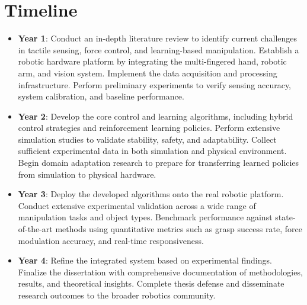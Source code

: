 \documentclass[11pt,a4paper]{article}
\begin{document}


\section{Timeline}

\begin{itemize}
    \item \textbf{Year 1}: Conduct an in-depth literature review to identify current challenges in tactile sensing, force control, and learning-based manipulation. Establish a robotic hardware platform by integrating the multi-fingered hand, robotic arm, and vision system. Implement the data acquisition and processing infrastructure. Perform preliminary experiments to verify sensing accuracy, system calibration, and baseline performance.
    
    \item \textbf{Year 2}: Develop the core control and learning algorithms, including hybrid control strategies and reinforcement learning policies. Perform extensive simulation studies to validate stability, safety, and adaptability. Collect sufficient experimental data in both simulation and physical environment. Begin domain adaptation research to prepare for transferring learned policies from simulation to physical hardware.
    
    \item \textbf{Year 3}: Deploy the developed algorithms onto the real robotic platform. Conduct extensive experimental validation across a wide range of manipulation tasks and object types. Benchmark performance against state-of-the-art methods using quantitative metrics such as grasp success rate, force modulation accuracy, and real-time responsiveness.
    \newpage
    \item \textbf{Year 4}: Refine the integrated system based on experimental findings. Finalize the dissertation with comprehensive documentation of methodologies, results, and theoretical insights. Complete thesis defense and disseminate research outcomes to the broader robotics community.
\end{itemize}
\end{document}
